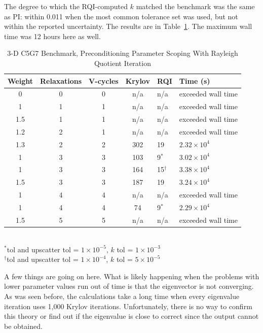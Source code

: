 The degree to which the RQI-computed $k$ matched the benchmark was the same as PI: within 0.011 when the most common tolerance set was used, but not within the reported uncertainty. The results are in Table~\ref{table:3-D c5g7 rqi}. The maximum wall time was 12 hours here as well. 
%
\begin{table}[!h]
\caption{3-D C5G7 Benchmark, Preconditioning Parameter Scoping With Rayleigh Quotient Iteration}
\begin{center}
\begin{tabular}{c c c c l l}
\hline
Weight & Relaxations & V-cycles & Krylov & RQI & Time (s) \\[0.5ex]
\hline
0    & 0 & 0 & n/a     & n/a          & exceeded wall time \\
1    & 1 & 1 & n/a     & n/a          & exceeded wall time \\
1.5 & 1 & 1 & n/a     & n/a          & exceeded wall time \\
1.2 & 2 & 1 & n/a     & n/a          & exceeded wall time \\
1.3 & 2 & 2 & 302    & 19           & $2.32 \times 10^{4}$ \\
1    & 3 & 3 & 103    & 9$^{*}$    & $3.02 \times 10^{4}$ \\
1    & 3 & 3 & 164    & 15$^{\dag}$ & $3.38 \times 10^{4}$ \\
1.5 & 3 & 3 & 187    & 19           & $3.24 \times 10^{4}$ \\
1    & 4 & 4 & n/a     & n/a          & exceeded wall time \\
1    & 4 & 4 & 74     & 9$^{*}$    & $2.29 \times 10^{4}$ \\
1.5 & 5 & 5 & n/a     & n/a          & exceeded wall time \\
\hline 
\end{tabular}\\
$^{*}$tol and upscatter tol = $1 \times 10^{-5}$, $k$ tol = $1 \times 10^{-3}$\\
$^{\dag}$tol and upscatter tol = $1 \times 10^{-4}$, $k$ tol = $5 \times 10^{-5}$
\end{center}
\label{table:3-D c5g7 rqi}
\end{table}  

A few things are going on here. What is likely happening when the problems with lower parameter values run out of time is that the eigenvector is not converging. As was seen before, the calculations take a long time when every eigenvalue iteration uses 1,000 Krylov iterations. Unfortunately, there is no way to confirm this theory or find out if the eigenvalue is close to correct since the output cannot be obtained. 


